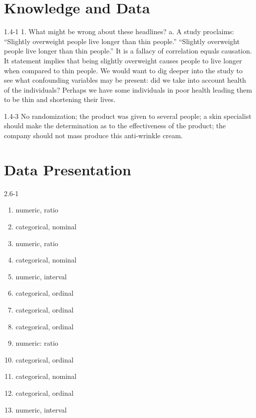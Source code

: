 \setcounter{chapter}{1}\chapter{Knowledge and Data}
\begin{exsol@solution}{1.4-1}
1.  What might be wrong about these headlines?
  a.	A study proclaims: ``Slightly overweight people live longer than thin people.'' ``Slightly overweight people live longer than thin people.''  It is a fallacy of correlation equals causation.  It statement implies that being slightly overweight causes people to live longer when compared to thin people.  We would want to dig deeper into the study to see what confounding variables may be present: did we take into account health of the individuals?  Perhaps we have some individuals in poor health leading them to be thin and shortening their lives.

\end{exsol@solution}
\begin{exsol@solution}{1.4-3}
No randomization; the product was given to several people; a skin specialist should make the determination as to the effectiveness of the product; the company should not mass produce this anti-wrinkle cream.

\end{exsol@solution}
\setcounter{chapter}{2}\chapter{Data Presentation}
\begin{exsol@solution}{2.6-1}
    \begin{enumerate}
	  \item   numeric, ratio
    \item  categorical, nominal
    \item  numeric, ratio
    \item  categorical, nominal
    \item  numeric, interval
    \item  categorical, ordinal
    \item  categorical, ordinal
    \item  categorical, ordinal
    \item  numeric: ratio
    \item  categorical, ordinal
    \item  categorical, nominal
    \item  categorical, ordinal
    \item  numeric, interval
  	\end{enumerate}
\end{exsol@solution}
